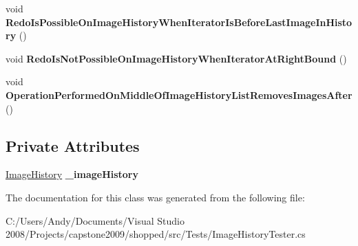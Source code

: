 \begin{DoxyCompactItemize}
\item 
\hypertarget{class_tests_1_1_image_history_tester_a980859bd655b762088f506f8e846dba9}{
void {\bfseries RedoIsPossibleOnImageHistoryWhenIteratorIsBeforeLastImageInHistory} ()}
\label{class_tests_1_1_image_history_tester_a980859bd655b762088f506f8e846dba9}

\item 
\hypertarget{class_tests_1_1_image_history_tester_abfe02273482ef2bb696eb14d4678ab6c}{
void {\bfseries RedoIsNotPossibleOnImageHistoryWhenIteratorAtRightBound} ()}
\label{class_tests_1_1_image_history_tester_abfe02273482ef2bb696eb14d4678ab6c}

\item 
\hypertarget{class_tests_1_1_image_history_tester_adbca01bd1a1bd7569c33278d55a4b4be}{
void {\bfseries OperationPerformedOnMiddleOfImageHistoryListRemovesImagesAfter} ()}
\label{class_tests_1_1_image_history_tester_adbca01bd1a1bd7569c33278d55a4b4be}

\end{DoxyCompactItemize}
\subsection*{Private Attributes}
\begin{DoxyCompactItemize}
\item 
\hypertarget{class_tests_1_1_image_history_tester_a223c27d8efd1e95d54478eccd9483e06}{
\hyperlink{class_core_1_1_image_history}{ImageHistory} {\bfseries \_\-imageHistory}}
\label{class_tests_1_1_image_history_tester_a223c27d8efd1e95d54478eccd9483e06}

\end{DoxyCompactItemize}


The documentation for this class was generated from the following file:\begin{DoxyCompactItemize}
\item 
C:/Users/Andy/Documents/Visual Studio 2008/Projects/capstone2009/shopped/src/Tests/ImageHistoryTester.cs\end{DoxyCompactItemize}
